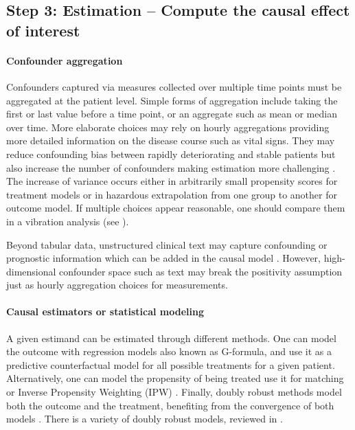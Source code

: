 \documentclass[10pt,letterpaper]{article}
\begin{document}
\subsection*{Step 3: Estimation -- Compute the causal effect of interest}\label{sec:estimation}

%

\paragraph{Confounder aggregation}
Confounders captured via measures collected over multiple time points must be
aggregated at the patient level. Simple forms of aggregation include taking the
first or last value before a time point, or an aggregate such as mean or median
over time. More elaborate choices may rely on hourly aggregations providing more
detailed information on the disease course such as vital signs. They may reduce
confounding bias between rapidly deteriorating and stable patients but also
increase the number of confounders making estimation more challenging
\cite{damour2020overlap}. The increase of variance occurs either in
arbitrarily small propensity scores for treatment models or in hazardous
extrapolation from one group to another for outcome model. If multiple
choices appear reasonable, one should compare them in a vibration analysis
(see ).

Beyond tabular data, unstructured clinical text may capture confounding or
prognostic information \cite{horng2017creating,jiang2023health} which can be
added in the causal model \cite{zeng2022uncovering}.
However, high-dimensional
confounder space such as text may break the positivity assumption just as hourly
aggregation choices for measurements.

\paragraph{Causal estimators or statistical modeling}

A given estimand can be estimated through different methods. One can model the
outcome with regression models also known as
G-formula, \cite{robins1986role} and use it as a predictive counterfactual model
for all possible treatments for a given patient. Alternatively, one can model
the propensity of being treated use it for matching or Inverse Propensity
Weighting (IPW) \cite{austin2015moving}. Finally, doubly robust methods model
both the outcome and the treatment, benefiting from the convergence of both
models \cite{wager2020stats}. There is a variety of doubly robust models,
reviewed in .
\end{document}
